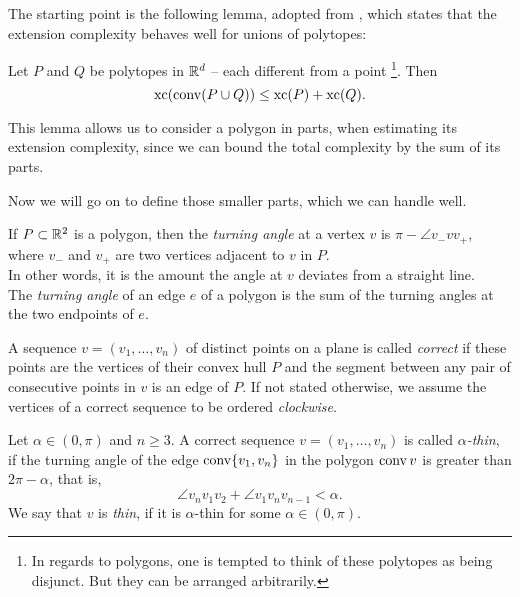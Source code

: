 The starting point is the following lemma, adopted from \cite[Proposition 3.1.1]{weltge2015sizes}, which states that the extension complexity behaves well for unions of polytopes:
\begin{lemma}\label{lemma:union}
  Let $P$ and $Q$ be polytopes in $\mathbb{R}^d$ -- each different from a point \footnote{In regards to polygons, one is tempted to think of these polytopes as being disjunct. But they can be arranged arbitrarily.}. Then $$\operatorname{xc}(\operatorname{conv}(P \cup Q)) \leq \operatorname{xc}(P) + \operatorname{xc}(Q) .$$
\end{lemma}

This lemma allows us to consider a polygon in parts, when estimating its extension complexity, since we can bound the total complexity by the sum of its parts.

Now we will go on to define those smaller parts, which we can handle well.

\begin{definition}
  If $P\subset\mathbb{R}^2$ is a polygon, then the \emph{turning angle} at a vertex $v$ is $\pi-\angle v_-vv_+$, where $v_-$ and $v_+$ are two vertices adjacent to $v$ in $P$. \\
  In other words, it is the amount the angle at $v$ deviates from a straight line. \\
  The \emph{turning angle} of an edge $e$ of a polygon is the sum of the turning angles at the two endpoints of $e$.
\end{definition}

\begin{definition}
  A sequence $v=(v_1,\ldots,v_n)$ of distinct points on a plane is called \emph{correct} if these points are the vertices of their convex hull $P$ and the segment between any pair of consecutive points in $v$ is an edge of $P$.
  If not stated otherwise, we assume the vertices of a correct sequence to be ordered \emph{clockwise}.
\end{definition}

\begin{definition}
  Let $\alpha\in(0,\pi)$ and $n \geq 3$. A correct sequence ${v=(v_1,\ldots,v_n)}$ is called \emph{$\alpha$-thin}, if the turning angle of the edge $\operatorname{conv}\{v_1, v_n\}$ in the polygon $\operatorname{conv} v$ is greater than $2\pi-\alpha$, that is, $$\angle v_n v_1 v_2+\angle v_1v_nv_{n-1}<\alpha.$$ We say that $v$ is \emph{thin}, if it is $\alpha$-thin for some $\alpha\in(0,\pi)$.
\end{definition}

